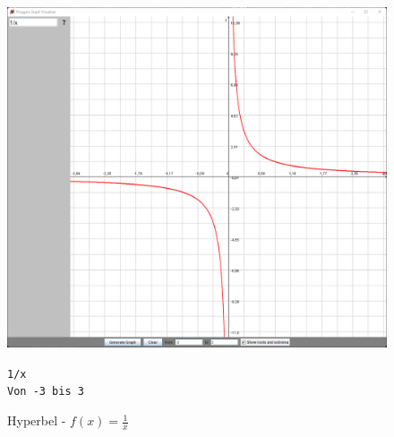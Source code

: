 \documentclass[12pt]{article}
\begin{document}
	\begin{figure}[!ht]
		\begin{center}
		\includegraphics[scale=0.5]{images/sample2.png}
		\end{center}
		\caption{Hyperbel - $f(x) = \frac{1}{x}$}

		\begin{center}
			\texttt{1/x} \\
			\texttt{Von -3 bis 3}
		\end{center}
	\end{figure}
\end{document}

